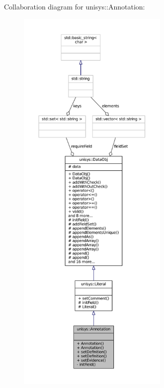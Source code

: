 Collaboration diagram for unisys\-:\-:Annotation\-:
\nopagebreak
\begin{figure}[H]
\begin{center}
\leavevmode
\includegraphics[height=550pt]{classunisys_1_1Annotation__coll__graph}
\end{center}
\end{figure}
